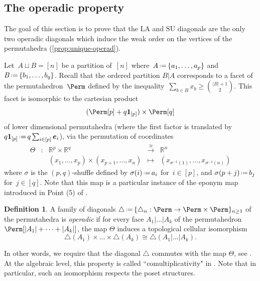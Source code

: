 \documentclass{amsart}
\newcommand{\darkblue}{\color{darkblue}} %
\theoremstyle{definition}
\newtheorem{definition}[theorem]{Definition}
\newcommand{\R}{\mathbb{R}} %
\renewcommand{\b}[1]{{\boldsymbol{#1}}} %
\newcommand{\one}{\b{1}} %
\newcommand{\eqdef}{\mbox{\,\raisebox{0.2ex}{\scriptsize\ensuremath{\mathrm:}}\ensuremath{=}\,}} %
\newcommand{\defn}[1]{\textsl{\darkblue #1}} %
\renewcommand{\b}[1]{\boldsymbol{#1}} %
\newcommand{\SU}{\mathrm{SU}}
\newcommand{\LA}{\mathrm{LA}}
\begin{document}

\subsection{The operadic property}
\label{subsec:operadicProperty}

The goal of this section is to prove that the $\LA$ and $\SU$ diagonals are the only two operadic diagonals which induce the weak order on the vertices of the permutahedra (\cref{prop:unique-operad}). 

Let~$A \sqcup B = [n]$ be a partition of~$[n]$ where~$A \eqdef \{a_1,\dots,a_p\}$ and~$B \eqdef \{b_1,\dots,b_q\}$.
Recall that the ordered partition $B | A$ corresponds to a facet of the permutahedron~$\Perm$ defined by the inequality~$\sum_{b \in B} x_b \ge \binom{|B|+1}{2}$.
This facet is isomorphic to the cartesian product
\[
(\Perm[p] +q \one_{[p]}) \times \Perm[q]
\]
of lower dimensional permutahedra (where the first factor is translated by~$q \one_{[p]} \eqdef q \sum_{i \in [p]} \b{e}_i$), via the permutation of coordinates
\begin{equation*}
	\begin{matrix}
		\Theta & : & \R^{p} \times \R^{q} & \overset{\cong}{\longrightarrow} & \R^{n} \\
		 & & (x_1,\ldots,x_p) \times (x_{p+1}, \ldots, x_{n})  & \longmapsto & (x_{\sigma^{-1}(1)},\ldots,x_{\sigma^{-1}(n)})
	\end{matrix}
\end{equation*}
where $\sigma$ is the $(p,q)$-shuffle defined by $\sigma(i) \eqdef a_i$ for~$i \in [p]$, and $\sigma(p+j)\eqdef b_j$ for~$j \in [q]$.
Note that this map is a particular instance of the eponym map introduced in Point (5) of \cite[Prop.~2.3]{LaplanteAnfossi}.

\begin{definition}
\label{def:operadicDiagonal}
A family of diagonals $\triangle \eqdef \{\triangle_n : \Perm \to \Perm \times \Perm\}_{n\geq 1}$ of the permutahedra is \defn{operadic} if for every face $A_1 | \ldots | A_k$ of the permutahedron $\Perm[|A_1|+\cdots + |A_k|]$, the map $\Theta$ induces a topological cellular isomorphism \[  \triangle(A_1) \times \ldots \times \triangle(A_k) \cong \triangle(A_1 | \ldots | A_k) . \]
\end{definition}
In other words, we require that the diagonal $\triangle$ commutes with the map $\Theta$, see \cite[Sect.~4.2]{LaplanteAnfossi}.
At the algebraic level, this property is called ``comultiplicativity" in \cite{SaneblidzeUmble}.
Note that in particular, such an isomorphism respects the poset structures. 
\end{document}
